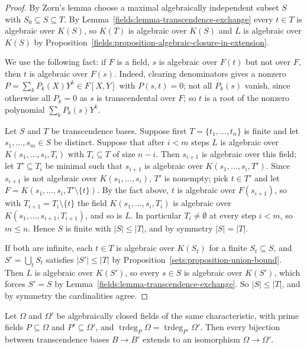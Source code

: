 \begin{proof}
By Zorn's lemma choose a maximal algebraically independent subset $S$ with
$S_0 \subseteq S \subseteq T$. By Lemma~\ref{fields:lemma-transcendence-exchange} every $t \in T$ is
algebraic over $K(S)$, so $K(T)$ is algebraic over $K(S)$ and $L$ is algebraic over $K(S)$ by
Proposition~\ref{fields:proposition-algebraic-closure-in-extension}.

We use the following fact: if $F$ is a field, $s$ is algebraic over $F(t)$ but not over $F$, then
$t$ is algebraic over $F(s)$. Indeed, clearing denominators gives a nonzero
$P = \sum_k P_k(X)Y^k \in F[X, Y]$ with $P(s, t) = 0$; not all $P_k(s)$ vanish, since otherwise all $P_k = 0$
as $s$ is transcendental over $F$; so $t$ is a root of the nonzero polynomial $\sum_k P_k(s)Y^k$.

Let $S$ and $T$ be transcendence bases. Suppose first $T = \{t_1, \ldots, t_n\}$ is finite and let
$s_1, \ldots, s_m \in S$ be distinct. Suppose that after $i < m$ steps $L$ is algebraic over
$K(s_1, \ldots, s_i, T_i)$ with $T_i \subseteq T$ of size $n - i$. Then $s_{i+1}$ is algebraic over this field;
let $T' \subseteq T_i$ be minimal such that $s_{i+1}$ is algebraic over $K(s_1, \ldots, s_i, T')$. Since $s_{i+1}$
is not algebraic over $K(s_1, \ldots, s_i)$, $T'$ is nonempty; pick $t \in T'$ and let
$F = K(s_1, \ldots, s_i, T' \setminus \{t\})$. By the fact above, $t$ is algebraic over $F(s_{i+1})$, so with
$T_{i+1} = T_i \setminus \{t\}$ the field $K(s_1, \ldots, s_i, T_i)$ is algebraic over
$K(s_1, \ldots, s_{i+1}, T_{i+1})$, and so is $L$. In particular $T_i \neq \emptyset$ at every step $i < m$,
so $m \leq n$. Hence $S$ is finite with $|S| \leq |T|$, and by symmetry $|S| = |T|$.

If both are infinite, each $t \in T$ is algebraic over $K(S_t)$ for a finite $S_t \subseteq S$, and
$S' = \bigcup_t S_t$ satisfies $|S'| \leq |T|$ by Proposition~\ref{sets:proposition-union-bound}. Then
$L$ is algebraic over $K(S')$, so every $s \in S$ is algebraic over $K(S')$, which forces $S' = S$
by Lemma~\ref{fields:lemma-transcendence-exchange}. So $|S| \leq |T|$, and by symmetry the
cardinalities agree.
\end{proof}

\begin{theorem}\label{fields:theorem-algebraically-closed-isomorphism}
Let $\Omega$ and $\Omega'$ be algebraically closed fields of the same characteristic, with prime fields
$P \subseteq \Omega$ and $P' \subseteq \Omega'$, and $\operatorname{trdeg}_P \Omega = \operatorname{trdeg}_{P'} \Omega'$. Then every bijection
between transcendence bases $B \to B'$ extends to an isomorphism $\Omega \to \Omega'$.
\end{theorem}

